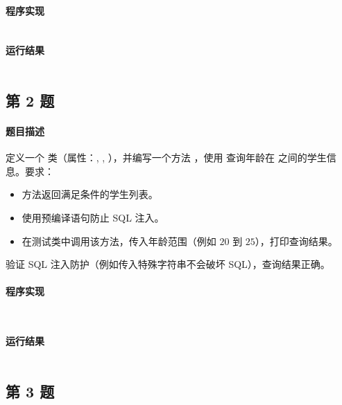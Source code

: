 \documentclass{academics}
\begin{document}
\paragraph{程序实现} {
    \inputminted[label=JdbcQuery.java]{java}{../src/P01/JdbcQuery.java}
}

\paragraph{运行结果} {
    \inputminted{text}{../res/P01.out}
}

\subsection{第 2 题}

\paragraph{题目描述} {
    定义一个  类（属性：, , ），并编写一个方法 ，使用  查询年龄在  之间的学生信息。要求：
    \begin{itemize}
        \item 方法返回满足条件的学生列表。
        \item 使用预编译语句防止 SQL 注入。
        \item 在测试类中调用该方法，传入年龄范围（例如 $20$ 到 $25$），打印查询结果。
    \end{itemize}
    验证 SQL 注入防护（例如传入特殊字符串不会破坏 SQL），查询结果正确。
}

\paragraph{程序实现} {
    \inputminted[label=Student.java]{java}{../src/P02/Student.java}
    \inputminted[label=PreparedQuery.java]{java}{../src/P02/PreparedQuery.java}
}

\paragraph{运行结果} {
    \inputminted{text}{../res/P02.out}
}

\subsection{第 3 题}
\end{document}

